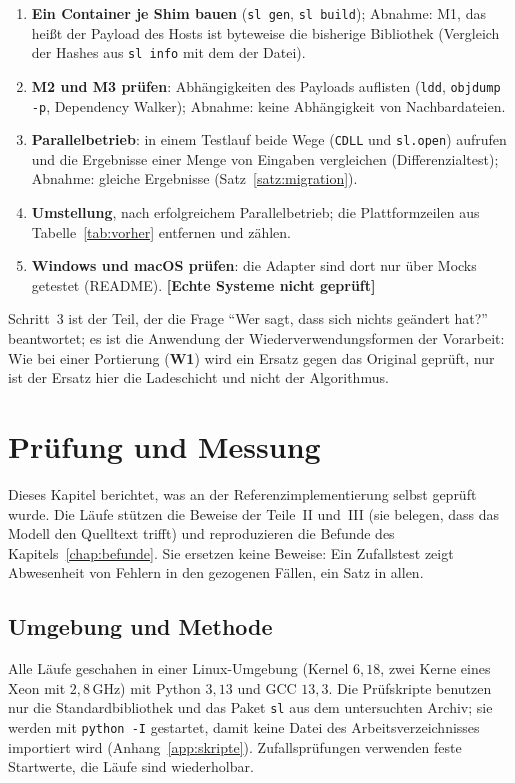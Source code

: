 \documentclass[a4paper,12pt,twoside]{report}
\DeclareRobustCommand{\_}{\ifmmode\mbox{\textunderscore}\else\textunderscore\allowbreak{}\fi}
\theoremstyle{definition}
\newcommand{\offen}[1]{\textcolor{accentred}{\textbf{[#1]}}}
\newcommand{\W}[1]{\textbf{W#1}}
\begin{document}
\begin{enumerate}
	\item \textbf{Ein Container je Shim bauen} (\texttt{sl gen}, \texttt{sl build}); Abnahme: M1, das heißt der Payload des Hosts ist byteweise die bisherige Bibliothek (Vergleich der Hashes aus \texttt{sl info} mit dem der Datei).
	\item \textbf{M2 und M3 prüfen}: Abhängigkeiten des Payloads auflisten (\texttt{ldd}, \texttt{objdump -p}, Dependency Walker); Abnahme: keine Abhängigkeit von Nachbardateien.
	\item \textbf{Parallelbetrieb}: in einem Testlauf beide Wege (\texttt{CDLL} und \texttt{sl.open}) aufrufen und die Ergebnisse einer Menge von Eingaben vergleichen (Differenzialtest); Abnahme: gleiche Ergebnisse (Satz~\ref{satz:migration}).
	\item \textbf{Umstellung}, nach erfolgreichem Parallelbetrieb; die Plattformzeilen aus Tabelle~\ref{tab:vorher} entfernen und zählen.
	\item \textbf{Windows und macOS prüfen}: die Adapter sind dort nur über Mocks getestet (README). \offen{Echte Systeme nicht geprüft}
\end{enumerate}

Schritt~3 ist der Teil, der die Frage ``Wer sagt, dass sich nichts geändert hat?'' beantwortet; es ist die Anwendung der Wiederverwendungsformen der Vorarbeit: Wie bei einer Portierung (\W{1}) wird ein Ersatz gegen das Original geprüft, nur ist der Ersatz hier die Ladeschicht und nicht der Algorithmus.


\chapter{Prüfung und Messung}
\label{chap:messung}

Dieses Kapitel berichtet, was an der Referenzimplementierung selbst geprüft wurde. Die Läufe stützen die Beweise der Teile~II und~III (sie belegen, dass das Modell den Quelltext trifft) und reproduzieren die Befunde des Kapitels~\ref{chap:befunde}. Sie ersetzen keine Beweise: Ein Zufallstest zeigt Abwesenheit von Fehlern in den gezogenen Fällen, ein Satz in allen.

\section{Umgebung und Methode}

Alle Läufe geschahen in einer Linux-Umgebung (Kernel $6{,}18$, zwei Kerne eines Xeon mit $2{,}8\,\mathrm{GHz}$) mit Python $3{,}13$ und GCC $13{,}3$. Die Prüfskripte benutzen nur die Standardbibliothek und das Paket \texttt{sl} aus dem untersuchten Archiv; sie werden mit \texttt{python -I} gestartet, damit keine Datei des Arbeitsverzeichnisses importiert wird (Anhang~\ref{app:skripte}). Zufallsprüfungen verwenden feste Startwerte, die Läufe sind wiederholbar.
\end{document}
